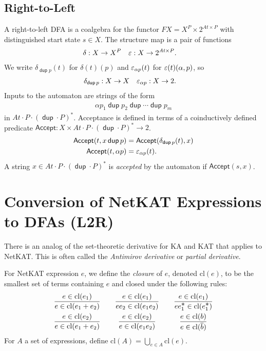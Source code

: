 \documentclass{article}
\newcommand\At{\ensuremath{\mathit{At}}}
\newcommand\pdup{\mathop{\mathsf{dup}}}
\renewcommand\star{^{\textstyle *}}
\newcommand\acc{\mathsf{Accept}}
\newcommand\clname{\mathrm{cl}}
\newcommand\cl[1]{\clname(#1)}
\begin{document}
\subsection*{Right-to-Left}

A right-to-left DFA is a coalgebra for the functor $FX = X^{P}\times 2^{\At\times P}$ with distinguished start state $s\in X$. The structure map is a pair of functions
\begin{align*}
\delta &: X\to X^{P} & \eps &: X\to 2^{\At\times P}.
\end{align*}
We write $\delta_{\pdup p}(t)$ for $\delta(t)(p)$ and $\varepsilon_{\alpha p}(t)$ for $\varepsilon(t)(\alpha,p)$, so
\begin{align*}
\delta_{\pdup p} &: X\to X & \eps_{\alpha p} &: X\to 2.
\end{align*}
Inputs to the automaton are strings of the form
\begin{align*}
\alpha p_1\pdup p_2\pdup\cdots\pdup p_m
\end{align*}
in $\At\cdot P\cdot(\pdup\cdot P)\star$. Acceptance is defined in terms of a coinductively defined predicate $\acc:X\times\At\cdot P\cdot(\pdup\cdot P)\star\to 2$.
\begin{align*}
\acc(t,x\pdup p) &= \acc(\delta_{\pdup p}(t),x)\\
\acc(t,\alpha p) &= \eps_{\alpha p}(t).
\end{align*}
A string $x\in\At\cdot P\cdot(\pdup\cdot P)\star$ is \emph{accepted} by the automaton if $\acc(s,x)$.

\section*{Conversion of NetKAT Expressions to DFAs (L2R)}

There is an analog of the set-theoretic derivative for KA \cite{} and KAT \cite{}
that applies to NetKAT. This is often called the \emph{Antimirov derivative} or
\emph{partial derivative}.

For NetKAT expression $e$, we define the \emph{closure} of $e$, denoted $\cl e$, to be the smallest set
of terms containing $e$ and closed under the following rules:
\begin{equation}
\begin{array}{c@{\qquad}c@{\qquad}c}
\dfrac{e\in\cl{e_1}}{e\in\cl{e_1+e_2}} & \dfrac{e\in\cl{e_1}}{ee_2\in\cl{e_1e_2}} & \dfrac{e\in\cl{e_1}}{ee_1\star\in\cl{e_1\star}}\\[1em]
\dfrac{e\in\cl{e_2}}{e\in\cl{e_1+e_2}} & \dfrac{e\in\cl{e_2}}{e\in\cl{e_1e_2}} & \dfrac{e\in\cl{b}}{e\in\cl{\bar b}}
\end{array}
\label{eq:cldef}
\end{equation}
For $A$ a set of expressions, define $\cl A = \bigcup_{e\in A} \cl e$.
\end{document}
